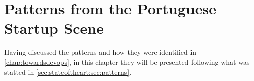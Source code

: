 \chapter{Patterns from the Portuguese Startup Scene} \label{chap:patterns}
		Having discussed the patterns and how they were identified in \ref{chap:towardsdevops}, in this chapter they will be presented following what was statted in \ref{sec:stateoftheart:sec:patterns}.\\




